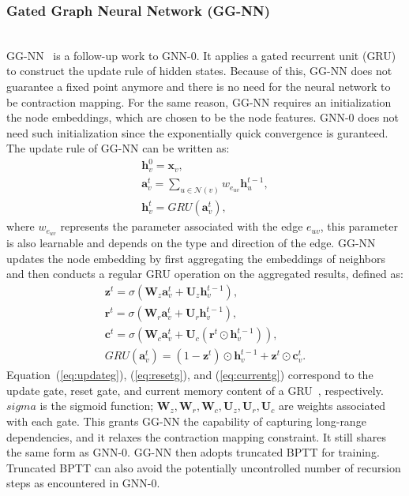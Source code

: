 \subsubsection{Gated Graph Neural Network (GG-NN)}\hfill \\
GG-NN~\cite{ggnn} is a follow-up work to GNN-0. It applies a gated recurrent unit (GRU) to construct the update rule of hidden states. Because of this, GG-NN does not guarantee a fixed point anymore and there is no need for the neural network to be contraction mapping. For the same reason, GG-NN requires an initialization the node embeddings, which are chosen to be the node features. GNN-0 does not need such initialization since the exponentially quick convergence is guranteed. The update rule of GG-NN can be written as:
\begin{gather}
\mathbf{h}_v ^0 = \mathbf{x}_v, \\
\mathbf{a}_v^t = \sum_{u \in \hat {\mathcal {N}}(v)} w_{e_{uv}} \mathbf{h}_u^{t-1},\\
\mathbf{h}_v^t = GRU(\mathbf{a}_v^t ),
\end{gather}
where $w_{e_{uv}}$ represents the parameter associated with the edge $e_{uv}$, this parameter is also learnable and depends on the type and direction of the edge. GG-NN updates the node embedding by first aggregating the embeddings of neighbors and then conducts a regular GRU operation on the aggregated results, defined as:
\begin{gather}
\mathbf{z}^t = \sigma(\mathbf{W}_z\mathbf{a}_v^t + \mathbf{U}_z\mathbf{h}_v^{t-1} ) \label{eq:updateg},\\
\mathbf{r}^t = \sigma(\mathbf{W}_r\mathbf{a}_v^t + \mathbf{U}_r\mathbf{h}_v^{t-1} ) \label{eq:resetg},\\
\mathbf{c}^t = \sigma(\mathbf{W}_c\mathbf{a}_v^t + \mathbf{U}_c(\mathbf{r}^t \odot \mathbf{h}_v^{t-1}) ) \label{eq:currentg},\\
GRU(\mathbf{a}_v^t) = (1 - \mathbf{z}^t ) \odot \mathbf{h}_v^{t-1} + \mathbf{z}^t \odot \mathbf{c}_v^{t}.
\end{gather} 
Equation~(\ref{eq:updateg}), (\ref{eq:resetg}), and (\ref{eq:currentg}) correspond to the update gate, reset gate, and current memory content of a GRU~\cite{gru}, respectively. $sigma$ is the sigmoid function; $\mathbf{W}_z, \mathbf{W}_r, \mathbf{W}_c, \mathbf{U}_z, \mathbf{U}_r, \mathbf{U}_c$ are weights associated with each gate. This grants GG-NN the capability of capturing long-range dependencies, and it relaxes the contraction mapping constraint. It still shares the same form as GNN-0. GG-NN then adopts truncated BPTT for training. Truncated BPTT can also avoid the potentially uncontrolled number of recursion steps as encountered in GNN-0. 

